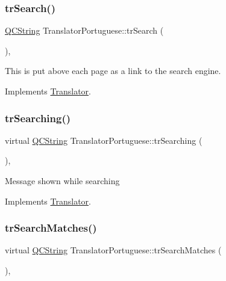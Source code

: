 \subsubsection{\texorpdfstring{trSearch()}{trSearch()}}
{\footnotesize\ttfamily \mbox{\hyperlink{class_q_c_string}{Q\+C\+String}} Translator\+Portuguese\+::tr\+Search (\begin{DoxyParamCaption}{ }\end{DoxyParamCaption})\hspace{0.3cm}{\ttfamily [inline]}, {\ttfamily [virtual]}}

This is put above each page as a link to the search engine. 

Implements \mbox{\hyperlink{class_translator}{Translator}}.

\mbox{\label{class_translator_portuguese_ac32d98dbe9331829953f07bfd3d4f3c4}} 
\subsubsection{\texorpdfstring{trSearching()}{trSearching()}}
{\footnotesize\ttfamily virtual \mbox{\hyperlink{class_q_c_string}{Q\+C\+String}} Translator\+Portuguese\+::tr\+Searching (\begin{DoxyParamCaption}{ }\end{DoxyParamCaption})\hspace{0.3cm}{\ttfamily [inline]}, {\ttfamily [virtual]}}

Message shown while searching 

Implements \mbox{\hyperlink{class_translator}{Translator}}.

\mbox{\label{class_translator_portuguese_af5e6b6501fc0557ec1443230c5c4909b}} 
\subsubsection{\texorpdfstring{trSearchMatches()}{trSearchMatches()}}
{\footnotesize\ttfamily virtual \mbox{\hyperlink{class_q_c_string}{Q\+C\+String}} Translator\+Portuguese\+::tr\+Search\+Matches (\begin{DoxyParamCaption}{ }\end{DoxyParamCaption})\hspace{0.3cm}{\ttfamily [inline]}, {\ttfamily [virtual]}}

